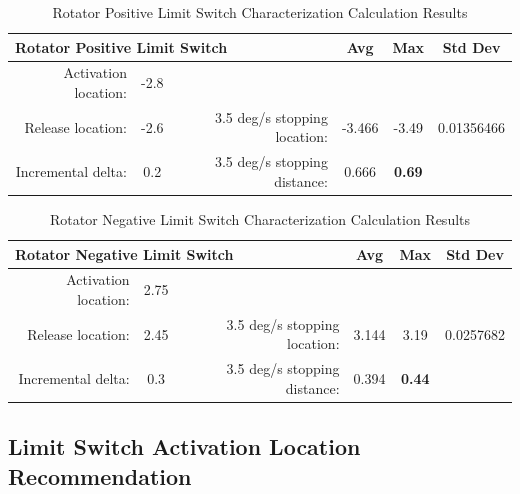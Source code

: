 \documentclass[SE,lsstdraft,authoryear,toc]{lsstdoc}
\begin{document}
\begin{landscape}
\begin{table}[h!]
  \begin{center}
    \caption{Rotator Positive Limit Switch Characterization Calculation Results}
    \label{tab:table3}
    \begin{tabular}{r|c|r|c|c|c}
    \multicolumn{3}{l|}{\textbf{Rotator Positive Limit Switch}} & Avg & Max & Std Dev\\
    \midrule
    Activation location: & -2.8 & & & &  \\
    Release location: & -2.6 & 3.5 deg/s stopping location: & -3.466 & -3.49 & 0.01356466 \\
    Incremental delta: & 0.2 & 3.5 deg/s stopping distance: & 0.666 & \textbf{0.69} & \\
    \end{tabular}
  \end{center}
\end{table}

\begin{table}[h!]
  \begin{center}
    \caption{Rotator Negative Limit Switch Characterization Calculation Results}
    \label{tab:table4}
    \begin{tabular}{r|c|r|c|c|c}
    \multicolumn{3}{l|}{\textbf{Rotator Negative Limit Switch}} & Avg & Max & Std Dev\\
    \midrule
    Activation location: & 2.75 & & & & \\
    Release location: & 2.45 & 3.5 deg/s stopping location: & 3.144 & 3.19 & 0.0257682 \\
    Incremental delta: & 0.3 & 3.5 deg/s stopping distance: & 0.394 & \textbf{0.44} & \\
    \end{tabular}
  \end{center}
\end{table}

\end{landscape}

\subsection{Limit Switch Activation Location Recommendation}
\end{document}
